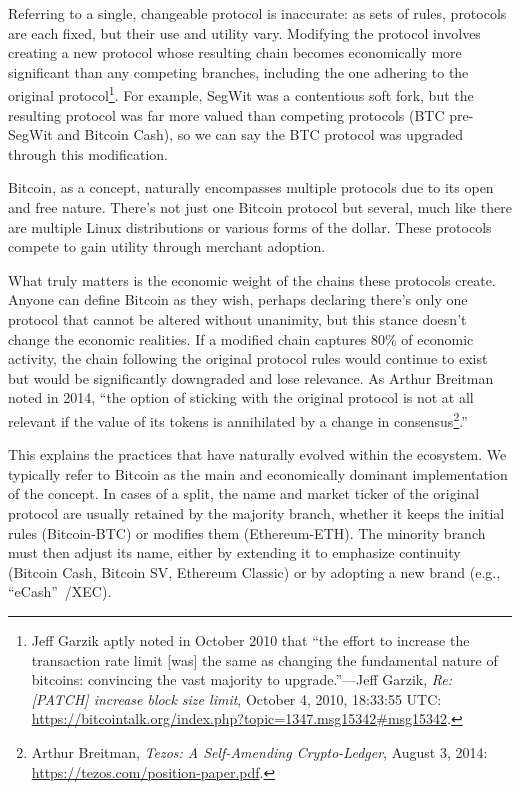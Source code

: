 \documentclass[
  a5paper,
  smalldemyvopaper,10pt,twoside,onecolumn,openright,extrafontsizes,hidelinks]{memoir}
\begin{document}
Referring to a single, changeable protocol is inaccurate: as sets of
rules, protocols are each fixed, but their use and utility vary.
Modifying the protocol involves creating a new protocol whose resulting
chain becomes economically more significant than any competing branches,
including the one adhering to the original protocol\footnote{Jeff Garzik
  aptly noted in October 2010 that ``the effort to increase the
  transaction rate limit {[}was{]} the same as changing the fundamental
  nature of bitcoins: convincing the vast majority to upgrade.''---Jeff
  Garzik, \emph{Re: {[}PATCH{]} increase block size limit}, October 4,
  2010, 18:33:55 UTC:
  \url{https://bitcointalk.org/index.php?topic=1347.msg15342\#msg15342}.}.
For example, SegWit was a contentious soft fork, but the resulting
protocol was far more valued than competing protocols (BTC pre-SegWit
and Bitcoin Cash), so we can say the BTC protocol was upgraded through
this modification.

Bitcoin, as a concept, naturally encompasses multiple protocols due to
its open and free nature. There's not just one Bitcoin protocol but
several, much like there are multiple Linux distributions or various
forms of the dollar. These protocols compete to gain utility through
merchant adoption.

What truly matters is the economic weight of the chains these protocols
create. Anyone can define Bitcoin as they wish, perhaps declaring
there's only one protocol that cannot be altered without unanimity, but
this stance doesn't change the economic realities. If a modified chain
captures 80\% of economic activity, the chain following the original
protocol rules would continue to exist but would be significantly
downgraded and lose relevance. As Arthur Breitman noted in 2014, ``the
option of sticking with the original protocol is not at all relevant if
the value of its tokens is annihilated by a change in
consensus\footnote{Arthur Breitman, \emph{Tezos: A Self-Amending
  Crypto-Ledger}, August 3, 2014:
  \url{https://tezos.com/position-paper.pdf}.}.''

This explains the practices that have naturally evolved within the
ecosystem. We typically refer to Bitcoin as the main and economically
dominant implementation of the concept. In cases of a split, the name
and market ticker of the original protocol are usually retained by the
majority branch, whether it keeps the initial rules (Bitcoin-BTC) or
modifies them (Ethereum-ETH). The minority branch must then adjust its
name, either by extending it to emphasize continuity (Bitcoin Cash,
Bitcoin SV, Ethereum Classic) or by adopting a new brand (e.g.,
``eCash''~/XEC).
\end{document}
